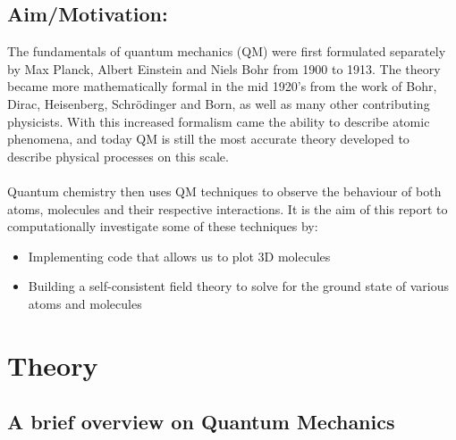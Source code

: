 \documentclass{article}
\begin{document}
\subsection{Aim/Motivation:}
The fundamentals of quantum mechanics (QM) were first formulated separately by Max Planck, Albert Einstein and Niels Bohr from 1900 to 1913. The theory became more mathematically formal in the mid 1920's from the work of Bohr, Dirac, Heisenberg, Schrödinger and Born, as well as many other contributing physicists. With this increased formalism came the ability to describe atomic phenomena, and today QM is still the most accurate theory developed to describe physical processes on this scale. 
\\ \\
Quantum chemistry then uses QM techniques to observe the behaviour of both atoms, molecules and their respective interactions. It is the aim of this report to computationally investigate some of these techniques by:
\begin{itemize}
    \item Implementing code that allows us to plot 3D molecules
    \item Building a self-consistent field theory to solve for the ground state of various atoms and molecules
\end{itemize}

\pagebreak

\section{Theory}
\subsection{A brief overview on Quantum Mechanics}
\end{document}

